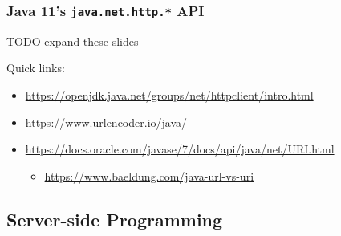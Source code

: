 \documentclass[presentation]{beamer}\mode<presentation>{\usetheme{AMSCesenaPurpleAndGold}}
\begin{document}
\begin{frame}%
    \frametitle{Java 11's \texttt{java.net.http.*} API}

    TODO expand these slides

    Quick links:
    \begin{itemize}
        \item \url{https://openjdk.java.net/groups/net/httpclient/intro.html}
        \item \url{https://www.urlencoder.io/java/}
        \item \url{https://docs.oracle.com/javase/7/docs/api/java/net/URI.html}
        \begin{itemize}
            \item \url{https://www.baeldung.com/java-url-vs-uri}
        \end{itemize}
    \end{itemize}

\end{frame}

\subsection{Server-side Programming}
\end{document}
